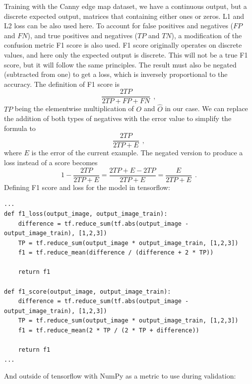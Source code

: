 \documentclass[12pt]{report}
\begin{document}
Training with the Canny edge map dataset, we have a continuous output, but a discrete expected output, matrices that containing either ones or zeros. L1 and L2 loss can be also used here. To account for false positives and negatives ($FP$ and $FN$), and true positives and negatives ($TP$ and $TN$), a modification of the confusion metric F1 score is also used. F1 score originally operates on discrete values, and here only the expected output is discrete. This will not be a true F1 score, but it will follow the same principles. The result must also be negated (subtracted from one) to get a loss, which is inversely proportional to the accuracy. The definition of F1 score is
\begin{equation*}
	\frac{2TP}{2TP + FP + FN}\ \ ,
\end{equation*}
$TP$ being the elementwise multiplication of $O$ and $\hat{O}$ in our case. We can replace the addition of both types of negatives with the error value to simplify the formula to
\begin{equation*}
	\frac{2TP}{2TP + E}\ \ ,
\end{equation*}
where $ E $ is the error of the current example. The negated version to produce a loss instead of a score becomes
\begin{equation*}
	1 - \frac{2TP}{2TP + E} = \frac{2TP + E - 2TP}{2TP + E} = \frac{E}{2TP + E}\ \ .
\end{equation*}
Defining F1 score and loss for the model in tensorflow:
\begin{center}
	\begin{minipage}{0.95\textwidth}
		\begin{lstlisting}[title=fcn\_model.py]
...
def f1_loss(output_image, output_image_train):
	difference = tf.reduce_sum(tf.abs(output_image - output_image_train), [1,2,3])
	TP = tf.reduce_sum(output_image * output_image_train, [1,2,3])
	f1 = tf.reduce_mean(difference / (difference + 2 * TP))

	return f1

def f1_score(output_image, output_image_train):
	difference = tf.reduce_sum(tf.abs(output_image - output_image_train), [1,2,3])
	TP = tf.reduce_sum(output_image * output_image_train, [1,2,3])
	f1 = tf.reduce_mean(2 * TP / (2 * TP + difference))

	return f1
...
		\end{lstlisting}
	\end{minipage}
\end{center}
And outside of tensorflow with NumPy as a metric to use during validation:
\end{document}

